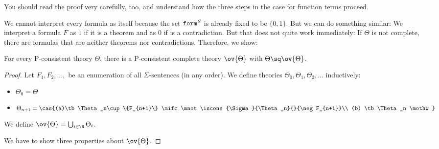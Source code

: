 You should read the proof very carefully, too, and understand how the three steps in the case for function terms proceed.

We cannot interpret every formula as itself because the set $\mathtt{form}^S$ is already fixed to be $\{0,1\}$.
But we can do something similar: We interpret a formula $F$ as $1$ if it is a theorem and as $0$ if is a contradiction.
But that does not quite work immediately: If $\Theta$ is not complete, there are formulas that are neither theorems nor contradictions.
Therefore, we show:

\begin{lemma}\label{thm:complete_extension}
For every P-consistent theory $\Theta$, there is a P-consistent complete theory $\ov{\Theta}$ with $\Theta\sq\ov{\Theta}$.
\end{lemma}
\begin{proof}
Let $F_1,F_2,\ldots,$ be an enumeration of all $\Sigma$-sentences (in any order).
We define theories $\Theta_0,\Theta_1,\Theta_2,\ldots$ inductively:
\begin{itemize}
  \item $\Theta_0=\Theta$
  \item $\Theta_{n+1}= \cas{(a)\tb \Theta_n\cup \{F_{n+1}\} \mifc \mnot \iscons{\Sigma}{\Theta_n}{}{\neg F_{n+1}}\\ (b) \tb \Theta_n \mothw }$
\end{itemize}
We define $\ov{\Theta}=\bigcup_{i\in\N}\Theta_i$.
\medskip

We have to show three properties about $\ov{\Theta}$.


\end{proof}
